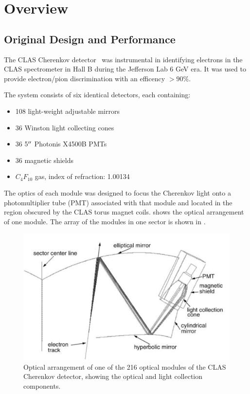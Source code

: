 \section{Overview}



\subsection{Original Design and Performance}

The CLAS Cherenkov detector~\cite{Adams:2001kk} was instrumental in identifying electrons in the CLAS spectrometer in Hall B during the Jefferson Lab 6 GeV era.
It was used to provide electron/pion discrimination with an efficency $ > 90\%$.

The system consists of six identical detectors, each containing:

\begin{itemize}
	\item 108 light-weight adjustable mirrors
	\item 36 Winston light collecting cones
	\item 36 5$^{\prime\prime}$ Photonis X4500B PMTs
	\item 36 magnetic shields
	\item $C_4F_{10}$ gas, index of refraction: 1.00134
\end{itemize}


The optics of each module was designed to focus the Cherenkov light onto a photomultiplier tube (PMT) associated with that module and located in the region
obscured by the CLAS torus magnet coils.
 shows the optical arrangement of one module. The array of the modules in one sector is shown in .

\begin{figure}[ht]
	\centering
	\includegraphics[width=1.0\columnwidth,keepaspectratio]{img/optics.png}
	\caption{Optical arrangement of one of the 216 optical modules of the CLAS Cherenkov detector, showing the optical and light collection components.}
	\label{fig:optics}
\end{figure}

